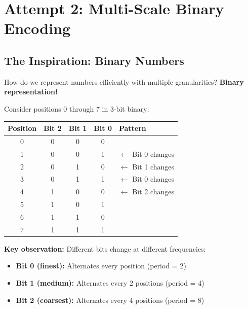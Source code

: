 \documentclass{article}
\begin{document}
\section{Attempt 2: Multi-Scale Binary Encoding}

\subsection{The Inspiration: Binary Numbers}

How do we represent numbers efficiently with multiple granularities? \textbf{Binary representation!}

Consider positions 0 through 7 in 3-bit binary:

\begin{center}
\begin{tabular}{c|ccc|l}
Position & Bit 2 & Bit 1 & Bit 0 & Pattern \\
\hline
0 & 0 & 0 & 0 & \\
1 & 0 & 0 & 1 & $\leftarrow$ Bit 0 changes\\
2 & 0 & 1 & 0 & $\leftarrow$ Bit 1 changes\\
3 & 0 & 1 & 1 & $\leftarrow$ Bit 0 changes\\
4 & 1 & 0 & 0 & $\leftarrow$ Bit 2 changes\\
5 & 1 & 0 & 1 & \\
6 & 1 & 1 & 0 & \\
7 & 1 & 1 & 1 & \\
\end{tabular}
\end{center}

\textbf{Key observation:} Different bits change at different frequencies:
\begin{itemize}
\item \textbf{Bit 0 (finest):} Alternates every position (period = 2)
\item \textbf{Bit 1 (medium):} Alternates every 2 positions (period = 4)
\item \textbf{Bit 2 (coarsest):} Alternates every 4 positions (period = 8)
\end{itemize}

\begin{center}
\end{center}
\end{document}
